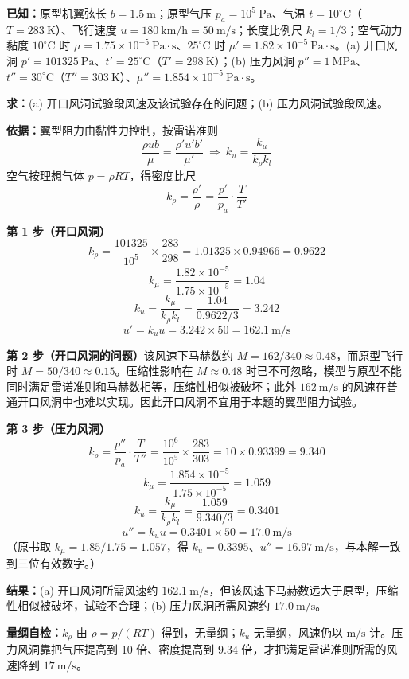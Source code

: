 \begin{jie}
\textbf{已知：}原型机翼弦长 $b=1.5\ \mathrm{m}$；原型气压 $p_a=10^{5}\ \mathrm{Pa}$、气温 $t=10^{\circ}\mathrm{C}$（$T=283\ \mathrm{K}$）、飞行速度 $u=180\ \mathrm{km/h}=50\ \mathrm{m/s}$；长度比例尺 $k_l=1/3$；空气动力黏度 $10^{\circ}\mathrm{C}$ 时 $\mu=1.75\times10^{-5}\ \mathrm{Pa\cdot s}$、$25^{\circ}\mathrm{C}$ 时 $\mu'=1.82\times10^{-5}\ \mathrm{Pa\cdot s}$。(a) 开口风洞 $p'=101325\ \mathrm{Pa}$、$t'=25^{\circ}\mathrm{C}$（$T'=298\ \mathrm{K}$）；(b) 压力风洞 $p''=1\ \mathrm{MPa}$、$t''=30^{\circ}\mathrm{C}$（$T''=303\ \mathrm{K}$）、$\mu''=1.854\times10^{-5}\ \mathrm{Pa\cdot s}$。

\textbf{求：}(a) 开口风洞试验段风速及该试验存在的问题；(b) 压力风洞试验段风速。

\textbf{依据：}翼型阻力由黏性力控制，按雷诺准则
\[\frac{\rho ub}{\mu}=\frac{\rho'u'b'}{\mu'}\ \Longrightarrow\ k_u=\frac{k_\mu}{k_\rho k_l}\]
空气按理想气体 $p=\rho RT$，得密度比尺
\[k_\rho=\frac{\rho'}{\rho}=\frac{p'}{p_a}\cdot\frac{T}{T'}\]

\textbf{第 1 步（开口风洞）}\quad
\[k_\rho=\frac{101325}{10^{5}}\times\frac{283}{298}=1.01325\times0.94966=0.9622\]
\[k_\mu=\frac{1.82\times10^{-5}}{1.75\times10^{-5}}=1.04\]
\[k_u=\frac{k_\mu}{k_\rho k_l}=\frac{1.04}{0.9622/3}=3.242\]
\[u'=k_uu=3.242\times50=162.1\ \mathrm{m/s}\]

\textbf{第 2 步（开口风洞的问题）}\quad 该风速下马赫数约 $M=162/340\approx0.48$，而原型飞行时 $M=50/340\approx0.15$。压缩性影响在 $M\approx0.48$ 时已不可忽略，模型与原型不能同时满足雷诺准则和马赫数相等，压缩性相似被破坏；此外 $162\ \mathrm{m/s}$ 的风速在普通开口风洞中也难以实现。因此开口风洞不宜用于本题的翼型阻力试验。

\textbf{第 3 步（压力风洞）}\quad
\[k_\rho=\frac{p''}{p_a}\cdot\frac{T}{T''}=\frac{10^{6}}{10^{5}}\times\frac{283}{303}=10\times0.93399=9.340\]
\[k_\mu=\frac{1.854\times10^{-5}}{1.75\times10^{-5}}=1.059\]
\[k_u=\frac{k_\mu}{k_\rho k_l}=\frac{1.059}{9.340/3}=0.3401\]
\[u''=k_uu=0.3401\times50=17.0\ \mathrm{m/s}\]
（原书取 $k_\mu=1.85/1.75=1.057$，得 $k_u=0.3395$、$u''=16.97\ \mathrm{m/s}$，与本解一致到三位有效数字。）

\textbf{结果：}(a) 开口风洞所需风速约 $162.1\ \mathrm{m/s}$，但该风速下马赫数远大于原型，压缩性相似被破坏，试验不合理；(b) 压力风洞所需风速约 $17.0\ \mathrm{m/s}$。

\textbf{量纲自检：}$k_\rho$ 由 $\rho=p/(RT)$ 得到，无量纲；$k_u$ 无量纲，风速仍以 $\mathrm{m/s}$ 计。压力风洞靠把气压提高到 10 倍、密度提高到 $9.34$ 倍，才把满足雷诺准则所需的风速降到 $17\ \mathrm{m/s}$。
\end{jie}

